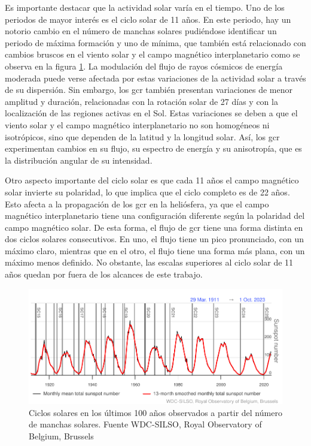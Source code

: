 Es importante destacar que la actividad solar varía en el tiempo. Uno de los periodos de mayor interés es el ciclo solar de 11 años. En este periodo, hay un notorio cambio en el número de manchas solares pudiéndose identificar un periodo de máxima formación y uno de mínima, que también está relacionado con cambios bruscos en el viento solar y el campo magnético interplanetario como se observa en la figura \ref{fig:100ysn}. La modulación del flujo de rayos cósmicos de energía moderada puede verse afectada por estas variaciones de la actividad solar a través de su dispersión. Sin embargo, los \gls{gcr} también presentan variaciones de menor amplitud y duración, relacionadas con la rotación solar de 27 días y con la localización de las regiones activas en el Sol. Estas variaciones se deben a que el viento solar y el campo magnético interplanetario no son homogéneos ni isotrópicos, sino que dependen de la latitud y la longitud solar. Así, los \gls{gcr} experimentan cambios en su flujo, su espectro de energía y su anisotropía, que es la distribución angular de su intensidad.

Otro aspecto importante del ciclo solar es que cada 11 años el campo magnético solar invierte su polaridad, lo que implica que el ciclo completo es de 22 años. Esto afecta a la propagación de los \gls{gcr} en la heliósfera, ya que el campo magnético interplanetario tiene una configuración diferente según la polaridad del campo magnético solar. De esta forma, el flujo de \gls{gcr} tiene una forma distinta en dos ciclos solares consecutivos. En uno, el flujo tiene un pico pronunciado, con un máximo claro, mientras que en el otro, el flujo tiene una forma más plana, con un máximo menos definido. No obstante, las escalas superiores al ciclo solar de 11 años quedan por fuera de los alcances de este trabajo.
\begin{figure}
    \centering
    \includegraphics[width=1\linewidth]{Figs/sunspots.pdf}
    \caption{Ciclos solares en los últimos 100 años observados a partir del número de manchas solares. Fuente WDC-SILSO, Royal Observatory of Belgium, Brussels}
    \label{fig:100ysn}
\end{figure}

